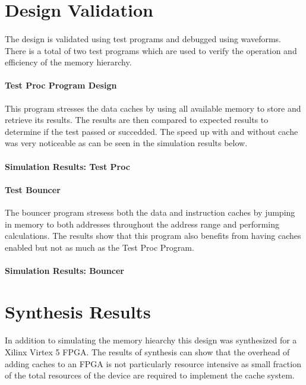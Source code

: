 \documentclass[11pt,letterpaper,final]{article}
\begin{document}
\section{ Design Validation }
\paragraph{}
The design is validated using test programs and debugged using waveforms. There is a total of two test programs which are used to verify the operation and efficiency of the memory hierarchy.  
\paragraph{ Test Proc Program Design }
This program stresses the data caches by using all available memory to store and retrieve its results.  The results are then compared to expected results to determine if the test passed or succedded.  The speed up with and without cache was very noticeable as can be seen in the simulation results below.  
\paragraph{ Simulation Results: Test Proc }

\paragraph{ Test Bouncer }
The bouncer program stresess both the data and instruction caches by jumping in memory to both addresses throughout the address range and performing calculations.  The results show that this program also benefits from having caches enabled but not as much as the Test Proc Program.  

\paragraph{ Simulation Results: Bouncer }


\section{ Synthesis Results }
\paragraph{}
In addition to simulating the memory hiearchy this design was synthesized for a Xilinx Virtex 5 FPGA.  The results of synthesis can show that the overhead of adding caches to an FPGA is not particularly resource intensive as small fraction of the total resources of the device are required to implement the cache system.
\end{document}
